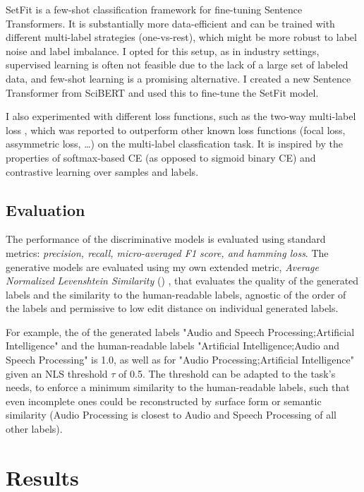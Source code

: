\documentclass[11pt,letterpaper]{article}
\begin{document}
SetFit \cite{tunstall2022efficient} is a few-shot classification framework for fine-tuning Sentence Transformers. It is substantially more data-efficient and can be trained with different multi-label strategies (one-vs-rest), which might be more robust to label noise and label imbalance. I opted for this setup, as in industry settings, supervised learning is often not feasible due to the lack of a large set of labeled data, and few-shot learning is a promising alternative. I created a new Sentence Transformer from SciBERT and used this to fine-tune the SetFit model.

I also experimented with different loss functions, such as the two-way multi-label loss \cite{kobayashi2023two}, which was reported to outperform other known loss functions (focal loss, assymmetric loss, \ldots) on the multi-label classfication task. It is inspired by the properties of softmax-based CE (as opposed to sigmoid binary CE) and contrastive learning over samples and labels.

\subsection{Evaluation}

The performance of the discriminative models is evaluated using standard metrics: \textit{precision, recall, micro-averaged F1 score, and hamming loss}.
The generative models are evaluated using my own extended metric, \textit{Average Normalized Levenshtein Similarity} (\ANLS) \cite{VanLandeghem2023dude}, that evaluates the quality of the generated labels and the similarity to the human-readable labels, agnostic of the order of the labels and permissive to low edit distance on individual generated labels.

For example, the \ANLS{} of the generated labels "Audio and Speech Processing;Artificial Intelligence" and the human-readable labels "Artificial Intelligence;Audio and Speech Processing" is 1.0, as well as for "Audio Processing;Artificial Intelligence" given an NLS threshold $\tau$ of 0.5. The threshold can be adapted to the task's needs, \eg to enforce a minimum similarity to the human-readable labels, such that even incomplete ones could be reconstructed by surface form or semantic similarity (\eg Audio Processing is closest to Audio and Speech Processing of all other labels).

\section{Results}
\end{document}
